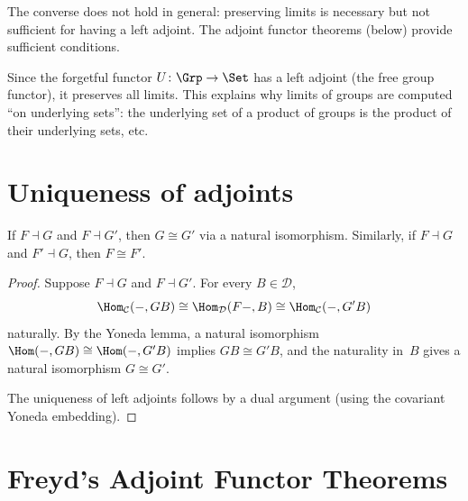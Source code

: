 \begin{remark}\label{rem:converse-not-true}
The converse does not hold in general: preserving limits is necessary
but not sufficient for having a left adjoint.  The adjoint functor
theorems (below) provide sufficient conditions.
\end{remark}

\begin{example}\label{ex:forgetful-preserves-limits}
Since the forgetful functor $U\colon\Grp\to\Set$ has a left adjoint
(the free group functor), it preserves all limits.  This explains why
limits of groups are computed ``on underlying sets'':
the underlying set of a product of groups is the product of their
underlying sets, etc.
\end{example}


\section{Uniqueness of adjoints}\label{sec:adj-unique}

\begin{theorem}\label{thm:adj-unique}
If $F\dashv G$ and $F\dashv G'$, then $G\cong G'$ via a natural
isomorphism.  Similarly, if $F\dashv G$ and $F'\dashv G$, then
$F\cong F'$.
\end{theorem}

\begin{proof}
Suppose $F\dashv G$ and $F\dashv G'$.  For every $B\in\mathcal{D}$,
\[
    \Hom_\mathcal{C}(-,GB)
    \cong \Hom_\mathcal{D}(F-,B)
    \cong \Hom_\mathcal{C}(-,G'B)
\]
naturally.  By the Yoneda lemma, a natural isomorphism
$\Hom(-,GB)\cong\Hom(-,G'B)$ implies $GB\cong G'B$,
and the naturality in~$B$ gives a natural isomorphism $G\cong G'$.

The uniqueness of left adjoints follows by a dual argument
(using the covariant Yoneda embedding).
\end{proof}


\section{Freyd's Adjoint Functor Theorems}\label{sec:GAFT}

